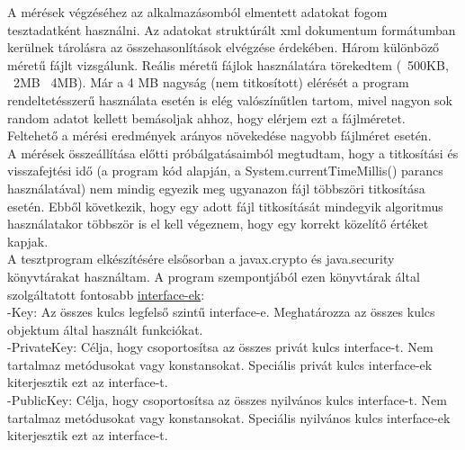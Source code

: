 \vspace{25pt}

A mérések végzéséhez az alkalmazásomból elmentett adatokat fogom tesztadatként használni. Az adatokat struktúrált xml dokumentum formátumban kerülnek tárolásra az összehasonlítások elvégzése érdekében. Három különböző méretű fájlt vizsgálunk. Reális méretű fájlok használatára törekedtem (~500KB, ~2MB ~4MB). Már a 4 MB nagyság (nem titkosított) elérését a program rendeltetésszerű használata esetén is elég valószínűtlen tartom, mivel nagyon sok random adatot kellett bemásoljak ahhoz, hogy elérjem ezt a fájlméretet. 
\vspace{5pt}\\Feltehető a mérési eredmények arányos növekedése nagyobb fájlméret esetén.
\vspace{5pt}\\A mérések összeállítása előtti próbálgatásaimból megtudtam, hogy a titkosítási és visszafejtési idő (a program kód alapján, a System.currentTimeMillis() parancs használatával) nem mindig egyezik meg ugyanazon fájl többszöri titkosítása esetén. Ebből következik, hogy egy adott fájl titkosítását mindegyik algoritmus használatakor többször is el kell végeznem, hogy egy korrekt közelítő értéket kapjak.
\vspace{5pt}\\A tesztprogram elkészítésére elsősorban a javax.crypto és java.security könyvtárakat használtam. A program szempontjából ezen könyvtárak által szolgáltatott fontosabb \underline{interface-ek}:
\vspace{5pt}\\-Key: Az összes kulcs legfelső szintű interface-e. Meghatározza az összes kulcs objektum által használt funkciókat.
\vspace{5pt}\\-PrivateKey: Célja, hogy csoportosítsa az összes privát kulcs interface-t. Nem tartalmaz metódusokat vagy konstansokat. Speciális privát kulcs interface-ek kiterjesztik ezt az interface-t. 
\vspace{5pt}\\-PublicKey: Célja, hogy csoportosítsa az összes nyilvános kulcs interface-t. Nem tartalmaz metódusokat vagy konstansokat. Speciális nyilvános kulcs interface-ek kiterjesztik ezt az interface-t. \newline

